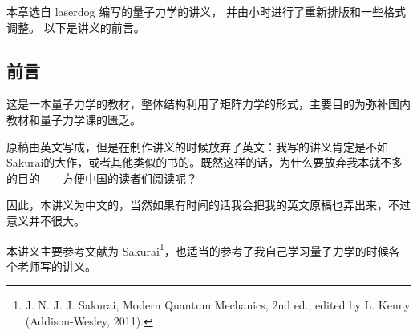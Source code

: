 
本章选自 laserdog 编写的量子力学的讲义，%
并由小时进行了重新排版和一些格式调整。 以下是讲义的前言。

\subsection{前言}

这是一本量子力学的教材，整体结构利用了矩阵力学的形式，主要目的为弥补国内教材和量子力学课的匮乏。

原稿由英文写成，但是在制作讲义的时候放弃了英文：我写的讲义肯定是不如Sakurai的大作，或者其他类似的书的。既然这样的话，为什么要放弃我本就不多的目的——方便中国的读者们阅读呢？

因此，本讲义为中文的，当然如果有时间的话我会把我的英文原稿也弄出来，不过意义并不很大。

本讲义主要参考文献为 Sakurai\footnote{J. N. J. J. Sakurai, Modern Quantum Mechanics, 2nd ed., edited by L. Kenny (Addison-Wesley, 2011).}，也适当的参考了我自己学习量子力学的时候各个老师写的讲义。
